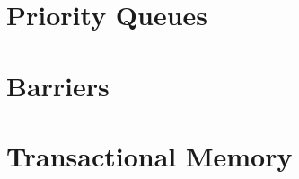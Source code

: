 \documentclass[letter,12pt]{report}
\begin{document}
\chapter{Priority Queues}




\chapter{Barriers}



\chapter{Transactional Memory}


\end{document}
